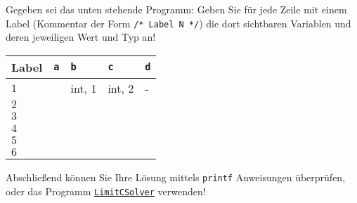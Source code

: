\documentclass[fontsize=11pt, parskip=half]{scrartcl}
\begin{document}
 \newpage

Gegeben sei das unten stehende Programm:
%
%
\subtask{} Geben Sie für jede Zeile mit einem Label (Kommentar der Form \texttt{/* Label N */}) die dort sichtbaren Variablen und deren jeweiligen Wert und Typ an!

\begin{minipage}{.80\textwidth}%
    \extrarowsep=4pt
    \begin{tabu} to 350pt {| X[c] | X[c] | X[c] | X[c] | X[c] |}%
    \hline
    \textbf{Label} & \texttt{a} & \texttt{b} & \texttt{c} & \texttt{d}\\
    \hline
    \textbf{$1$} & & int, 1 & int, 2 & - \\ %
    \hline
    \textbf{$2$} & & & & \\ %
    \hline
    \textbf{$3$} & & & & \\ %
    \hline
    \textbf{$4$} & & & & \\ %
    \hline
    \textbf{$5$} & & & & \\ %
    \hline
    \textbf{$6$} & & & & \\ %
    \hline
    \end{tabu}
\end{minipage}%


\subtask{} Abschließend können Sie Ihre Lösung mittels \texttt{printf} Anweisungen überprüfen, oder das Programm \href{https://github.com/HOME-programming-pub/LimitCSolver}{\texttt{LimitCSolver}} verwenden! 
\end{document}
